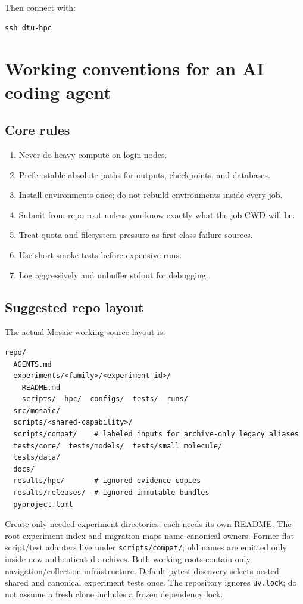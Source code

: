 \documentclass[11pt,a4paper]{article}
\begin{document}
Then connect with:

\begin{lstlisting}[style=shell]
ssh dtu-hpc
\end{lstlisting}

\section{Working conventions for an AI coding agent}

\subsection{Core rules}

\begin{enumerate}[leftmargin=1.5em]
  \item Never do heavy compute on login nodes.
  \item Prefer stable absolute paths for outputs, checkpoints, and databases.
  \item Install environments once; do not rebuild environments inside every job.
  \item Submit from repo root unless you know exactly what the job CWD will be.
  \item Treat quota and filesystem pressure as first-class failure sources.
  \item Use short smoke tests before expensive runs.
  \item Log aggressively and unbuffer stdout for debugging.
\end{enumerate}

\subsection{Suggested repo layout}

The actual Mosaic working-source layout is:

\begin{lstlisting}[style=shell]
repo/
  AGENTS.md
  experiments/<family>/<experiment-id>/
    README.md
    scripts/  hpc/  configs/  tests/  runs/
  src/mosaic/
  scripts/<shared-capability>/
  scripts/compat/    # labeled inputs for archive-only legacy aliases
  tests/core/  tests/models/  tests/small_molecule/
  tests/data/
  docs/
  results/hpc/       # ignored evidence copies
  results/releases/  # ignored immutable bundles
  pyproject.toml
\end{lstlisting}

Create only needed experiment directories; each needs its own README.
The root experiment index and migration maps name canonical owners. Former flat
script/test adapters live under \texttt{scripts/compat/}; old names are emitted
only inside new authenticated archives. Both working roots contain only
navigation/collection infrastructure. Default pytest discovery selects nested shared and canonical experiment
tests once. The repository ignores \texttt{uv.lock};
do not assume a fresh clone includes a frozen dependency lock.
\end{document}
